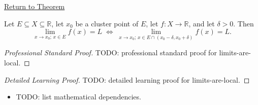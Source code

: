 \newpage
{}
\label{prf:limits-are-local}

\begin{remark*}[Return]
\hyperref[thm:limits-are-local]{Return to Theorem}
\end{remark*}

\begin{theorem*}
Let $E \subseteq X \subseteq \mathbb{R}$, let $x_0$ be a cluster
point of $E$, let $f : X \to \mathbb{R}$, and let $\delta > 0$.
Then
\[
  \lim_{x\to x_0;\,x\in E}f(x)=L
  \;\iff\;
  \lim_{x\to x_0;\,x\in E\cap(x_0-\delta,x_0+\delta)}f(x)=L.
\]

\smallskip\noindent
\end{theorem*}

\begin{proof}[Professional Standard Proof]
\LRAProofBodyStart
TODO: professional standard proof for limits-are-local.
\end{proof}

\begin{proof}[Detailed Learning Proof]
\LRAProofBodyStart
TODO: detailed learning proof for limits-are-local.
\end{proof}

\begin{remark*}
\end{remark*}

\begin{dependencies}
\begin{itemize}
  \item TODO: list mathematical dependencies.
\end{itemize}
\end{dependencies}

\clearpage
